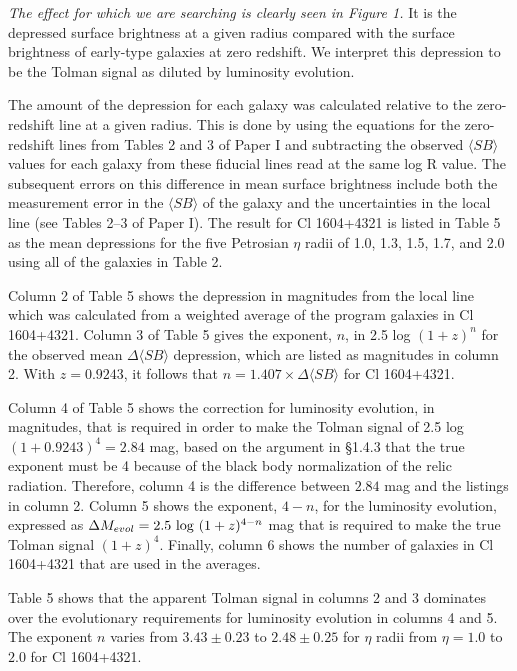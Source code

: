 \documentclass[preprint]{aastex}
\begin{document}
{\it The effect for which we are searching is clearly seen in Figure
1.}  It is the depressed surface brightness at a given radius compared
with the surface brightness of early-type galaxies at zero
redshift. We interpret this depression to be the Tolman signal as
diluted by luminosity evolution.
 
The amount of the depression for each galaxy was calculated relative
to the zero-redshift line at a given radius. This is done by using the
equations for the zero-redshift lines from Tables 2 and 3 of Paper I
and subtracting the observed $\langle SB \rangle$ values for each
galaxy from these fiducial lines read at the same log R value. The
subsequent errors on this difference in mean surface brightness
include both the measurement error in the $\langle SB \rangle$ of the
galaxy and the uncertainties in the local line (see Tables 2--3 of
Paper I).  The result for Cl 1604+4321 is listed in Table 5 as the
mean depressions for the five Petrosian $\eta$ radii of 1.0, 1.3, 1.5,
1.7, and 2.0 using all of the galaxies in Table 2.

Column 2 of Table 5 shows the depression in magnitudes from the local
line which was calculated from a weighted average of the program
galaxies in Cl 1604+4321.  Column 3 of Table 5 gives the exponent,
$n$, in 2.5 log $(1 + z)^n$ for the observed mean $\Delta\langle SB
\rangle$ depression, which are listed as magnitudes in column 2. With
$z = 0.9243$, it follows that $n = 1.407 \times \Delta \langle SB
\rangle$ for Cl 1604+4321.

Column 4 of Table 5 shows the correction for luminosity evolution, in
magnitudes, that is required in order to make the Tolman signal of 2.5
log $(1 + 0.9243)^4 = 2.84$ mag, based on the argument in \S 1.4.3
that the true exponent must be 4 because of the black body
normalization of the relic radiation.  Therefore, column 4 is the
difference between $2.84$ mag and the listings in column 2.  Column 5
shows the exponent, $4 - n$, for the luminosity evolution, expressed
as $\Delta M_{evol} = 2.5~{\rm log}~(1+z)^{4-n}$ mag that is required
to make the true Tolman signal $(1 + z)^4$. Finally, column 6 shows
the number of galaxies in Cl 1604+4321 that are used in the averages.
     
Table 5 shows that the apparent Tolman signal in columns 2 and 3
dominates over the evolutionary requirements for luminosity evolution
in columns 4 and 5. The exponent $n$ varies from $3.43 \pm 0.23$ to
$2.48 \pm 0.25$ for $\eta$ radii from $\eta = 1.0$ to $2.0$ for Cl
1604+4321. 
\end{document}
